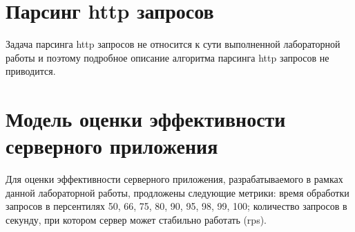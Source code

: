 \section{Парсинг http запросов}

Задача парсинга http запросов не относится к сути выполненной лабораторной работы и поэтому подробное описание алгоритма парсинга http запросов не приводится.



\section{Модель оценки эффективности серверного приложения}

Для оценки эффективности серверного приложения, разрабатываемого в рамках данной лабораторной работы, продложены следующие метрики: время обработки запросов в персентилях 50, 66, 75, 80, 90, 95, 98, 99, 100; количество запросов в секунду, при котором сервер может стабильно работать (rps).


